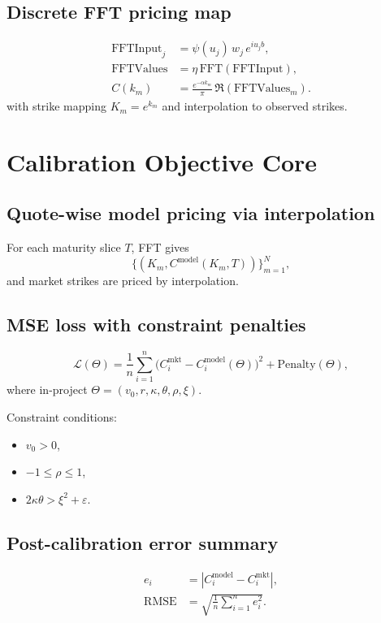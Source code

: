 \documentclass[11pt]{article}
\begin{document}
\subsection{Discrete FFT pricing map}
\begin{align}
\text{FFTInput}_j &= \psi(u_j)\,w_j\,e^{iu_j b},\\
\text{FFTValues} &= \eta\,\mathrm{FFT}(\text{FFTInput}),\\
C(k_m) &= \frac{e^{-\alpha k_m}}{\pi}\,\Re\!\left(\text{FFTValues}_m\right).
\end{align}
with strike mapping $K_m=e^{k_m}$ and interpolation to observed strikes.

\section{Calibration Objective Core}

\subsection{Quote-wise model pricing via interpolation}
For each maturity slice $T$, FFT gives
\begin{equation}
\{(K_m,C^{\text{model}}(K_m,T))\}_{m=1}^N,
\end{equation}
and market strikes are priced by interpolation.

\subsection{MSE loss with constraint penalties}
\begin{equation}
\mathcal{L}(\Theta) = \frac{1}{n}\sum_{i=1}^n\Big(C_i^{\text{mkt}}-C_i^{\text{model}}(\Theta)\Big)^2 + \text{Penalty}(\Theta),
\end{equation}
where in-project $\Theta=(v_0,r,\kappa,\theta,\rho,\xi)$.

Constraint conditions:
\begin{itemize}[leftmargin=2em]
    \item $v_0>0$,
    \item $-1\le \rho\le 1$,
    \item $2\kappa\theta > \xi^2 + \varepsilon$.
\end{itemize}

\subsection{Post-calibration error summary}
\begin{align}
 e_i &= \left|C_i^{\text{model}}-C_i^{\text{mkt}}\right|,\\
 \mathrm{RMSE} &= \sqrt{\frac{1}{n}\sum_{i=1}^n e_i^2}.
\end{align}
\end{document}
